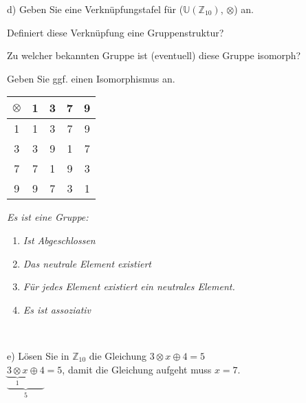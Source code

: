d) Geben Sie eine Verknüpfungstafel für ($\mathbb{U}(\mathbb{Z}_{10})$, $\otimes$) an.\

\hspace{0.55cm}Definiert diese Verknüpfung eine Gruppenstruktur?\

\hspace{0.55cm}Zu welcher bekannten Gruppe ist (eventuell) diese Gruppe isomorph?\

\hspace{0.55cm}Geben Sie ggf. einen Isomorphismus an.\

\begin{table}[h]
\centering
\begin{tabular}{c|cccc}
$\otimes$ & 1 & 3 & 7 & 9\\
\hline
1 & 1 & 3 & 7 & 9\\
3 & 3 & 9 & 1 & 7\\
7 & 7 & 1 & 9 & 3\\
9 & 9 & 7 & 3 & 1
\end{tabular}
\end{table}

\textit{Es ist eine Gruppe:}
\begin{enumerate}
\item \textit{Ist Abgeschlossen}
\item \textit{Das neutrale Element existiert}
\item \textit{Für jedes Element existiert ein neutrales Element.}
\item \textit{Es ist assoziativ}
\end{enumerate}\

e) Lösen Sie in $\mathbb{Z}_{10}$ die Gleichung $3 \otimes x \oplus 4 = 5$\\

$\underbrace{\underbrace{3 \otimes x}_{1} \oplus 4}_{5} = 5$, damit die Gleichung aufgeht muss $x = 7$.

\newpage


